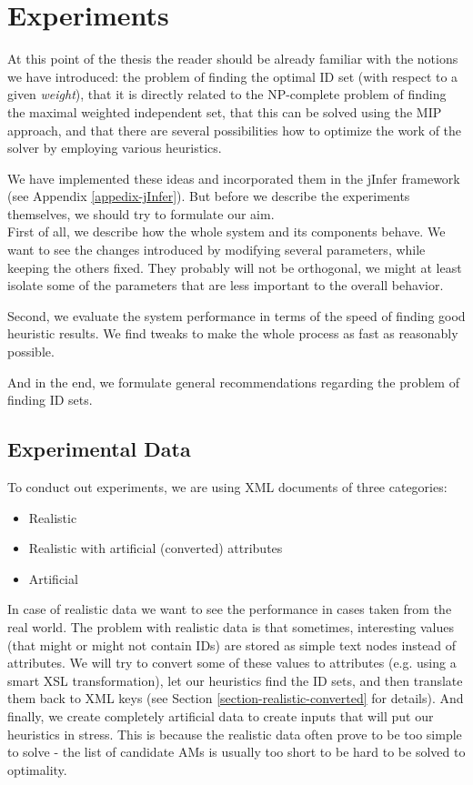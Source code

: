 \chapter{Experiments}

At this point of the thesis the reader should be already familiar with the notions we have introduced: the problem of finding the optimal ID set (with respect to a given \textit{weight}), that it is directly related to the NP-complete problem of finding the maximal weighted independent set, that this can be solved using the MIP approach, and that there are several possibilities how to optimize the work of the solver by employing various heuristics.

We have implemented these ideas and incorporated them in the jInfer framework (see Appendix \ref{appedix-jInfer}). But before we describe the experiments themselves, we should try to formulate our aim.\\

First of all, we describe how the whole system and its components behave. We want to see the changes introduced by modifying several parameters, while keeping the others fixed. They probably will not be orthogonal, we might at least isolate some of the parameters that are less important to the overall behavior.

Second, we evaluate the system performance in terms of the speed of finding good heuristic results. We find tweaks to make the whole process as fast as reasonably possible.

And in the end, we formulate general recommendations regarding the problem of finding ID sets.

\section{Experimental Data}
\label{section-experiments-data}

To conduct out experiments, we are using XML documents of three categories:

\begin{itemize}
	\item Realistic
	\item Realistic with artificial (converted) attributes
	\item Artificial
\end{itemize}

In case of realistic data we want to see the performance in cases taken from the real world. The problem with realistic data is that sometimes, interesting values (that might or might not contain IDs) are stored as simple text nodes instead of attributes. We will try to convert some of these values to attributes (e.g. using a smart XSL transformation), let our heuristics find the ID sets, and then translate them back to XML keys (see Section \ref{section-realistic-converted} for details).
And finally, we create completely artificial data to create inputs that will put our heuristics in stress. This is because the realistic data often prove to be too simple to solve - the list of candidate AMs is usually too short to be hard to be solved to optimality.

